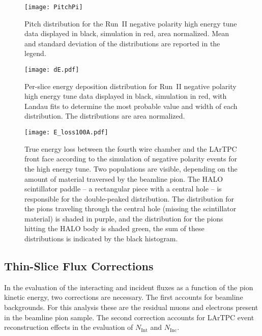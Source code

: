\documentclass[%
 floatfix,
 reprint,
 twocolumn,
superscriptaddress,
showpacs,preprintnumbers,
 amsmath,amssymb,
 aps,
prd,
]{revtex4-1}
\begin{document}
\begin{figure}
\texttt{[image: PitchPi]}
\caption{\label{fig:pitch}  Pitch distribution for the Run~II negative polarity high energy tune data displayed in black, simulation in red, area normalized. Mean and standard deviation of the distributions are reported in the legend.
}
\end{figure}
\begin{figure}
\texttt{[image: dE.pdf]}
\caption{\label{fig:enDep}  Per-slice energy deposition distribution for Run~II negative polarity high energy tune data displayed in black, simulation in red, with Landau fits to determine the most probable value and width of each distribution. The distributions are area normalized.}
\end{figure}

\begin{figure}
\centering
\texttt{[image: E\_loss100A.pdf]}
\caption{\label{fig:ELoss100A}  True energy loss between the fourth wire chamber and the LArTPC front face according to the simulation of negative polarity events for the high energy tune. Two populations are visible, depending on the amount of material traversed by the beamline pion. The HALO scintillator paddle -- a rectangular piece with a central hole -- is responsible for the double-peaked distribution. The distribution for the pions traveling through the central hole (missing the scintillator material) is shaded in purple, and the distribution for the pions hitting the HALO body is shaded green, the sum of these distributions is indicated by the black histogram. }
\end{figure}

\subsection{\label{sec:Corrections0}Thin-Slice Flux Corrections}
In the evaluation of the interacting and incident fluxes as a function of the pion kinetic energy,  two corrections are necessary. The first accounts for beamline backgrounds. For this analysis these are the residual muons and electrons present in the beamline pion sample. The second correction accounts for LArTPC event reconstruction effects in the evaluation of  $N_{\text{Int}}$ and $N_{\text{Inc}}$.
\end{document}
